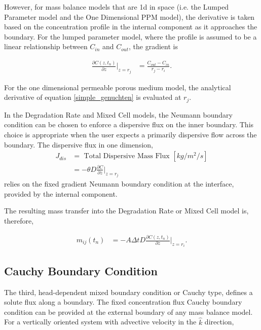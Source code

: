 However, for mass balance models that are 1d in space (i.e. the Lumped Parameter model 
and the One Dimensional PPM model), the derivative is taken based on the 
concentration profile in the internal component as it approaches the boundary. 
For the lumped parameter model, where the profile is assumed to be a linear 
relationship between $C_{in}$ and $C_{out}$, the gradient is

\begin{align} 
\frac{\partial C(z,t_n)}{\partial z}\Bigg|_{z=r_j} &= \frac{C_{out} - C_{in}}{r_{j} - r_{i}}.
\end{align}

For the one dimensional permeable porous medium model, the analytical 
derivative of equation \eqref{simple_genuchten} is evaluated at $r_j$.


In the Degradation Rate and Mixed Cell models, the Neumann boundary condition 
can be chosen to enforce a dispersive flux on the inner boundary. This choice 
is appropriate when the user expects a primarily dispersive flow across the 
boundary.
The dispersive flux in one dimension, 
\begin{align}
      J_{dis} &= \mbox{ Total Dispersive Mass Flux }[kg/m^2/s]\nonumber\\
      &= -\theta D\frac{\partial C}{\partial z}\Big|_{z=r_j} \nonumber
\end{align}
relies on the fixed gradient Neumann boundary condition at the interface, 
provided by the internal component. 

The resulting mass transfer into the Degradation Rate or Mixed Cell model is, 
therefore, 

\begin{align}
m_{ij}(t_n) &= - A\Delta t D \frac{\partial C(z,t_n)}{\partial z}|_{z=r_i}.
\end{align}


\subsection{Cauchy Boundary Condition}

The third, head-dependent mixed boundary condition or Cauchy type, defines a 
solute flux along a boundary.  The fixed concentration flux Cauchy boundary 
condition can be provided at the external boundary of any mass balance model.  
For a vertically oriented system with advective velocity in the $\hat{k}$ 
direction,

